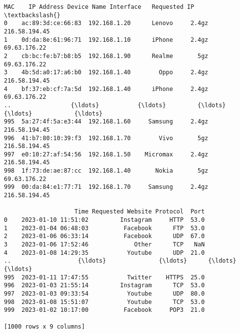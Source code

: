 \documentclass[11pt]{article}
\makeatletter
\newcommand{\boxspacing}{\kern\kvtcb@left@rule\kern\kvtcb@boxsep}
\newcommand{\prompt}[4]{
        {\ttfamily\llap{{\color{#2}[#3]:\hspace{3pt}#4}}\vspace{-\baselineskip}}
    }
\makeatother
\begin{document}
            \begin{tcolorbox}[breakable, size=fbox, boxrule=.5pt, pad at break*=1mm, opacityfill=0]
\prompt{Out}{outcolor}{15}{\boxspacing}
\begin{Verbatim}[commandchars=\\\{\}]
                   MAC    IP Address Device Name Interface   Requested IP  \textbackslash{}
0    ac:89:3d:ce:66:83  192.168.1.20      Lenovo     2.4gz  216.58.194.45
1    0d:da:8e:61:96:71  192.168.1.10      iPhone     2.4gz   69.63.176.22
2    cb:bc:fe:b7:b8:b5  192.168.1.90      Realme       5gz   69.63.176.22
3    4b:5d:a0:17:a6:b0  192.168.1.40        Oppo     2.4gz  216.58.194.45
4    bf:37:eb:cf:7a:5d  192.168.1.40      iPhone     2.4gz   69.63.176.22
..                 {\ldots}           {\ldots}         {\ldots}       {\ldots}            {\ldots}
995  5a:27:4f:5a:e3:44  192.168.1.60     Samsung     2.4gz  216.58.194.45
996  41:b7:80:10:39:f3  192.168.1.70        Vivo       5gz  216.58.194.45
997  e0:10:27:af:54:56  192.168.1.50    Micromax     2.4gz  216.58.194.45
998  1f:73:de:ae:87:cc  192.168.1.40       Nokia       5gz   69.63.176.22
999  00:da:84:e1:77:71  192.168.1.70     Samsung     2.4gz  216.58.194.45

                    Time Requested Website Protocol  Port
0    2023-01-10 11:51:02         Instagram     HTTP  53.0
1    2023-01-04 06:48:03          Facebook      FTP  53.0
2    2023-01-06 06:33:14          Facebook      UDP  67.0
3    2023-01-06 17:52:46             Other      TCP   NaN
4    2023-01-08 14:29:35           Youtube      UDP  21.0
..                   {\ldots}               {\ldots}      {\ldots}   {\ldots}
995  2023-01-11 17:47:55           Twitter    HTTPS  25.0
996  2023-01-03 21:55:14         Instagram      TCP  53.0
997  2023-01-03 09:33:54           Youtube      UDP  80.0
998  2023-01-08 15:51:07           Youtube      TCP  53.0
999  2023-01-02 10:17:00          Facebook     POP3  21.0

[1000 rows x 9 columns]
\end{Verbatim}
\end{tcolorbox}
        
\end{document}
